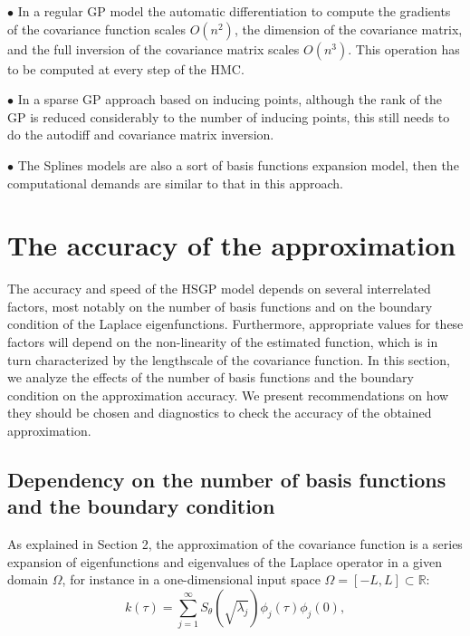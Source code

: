 \documentclass[]{interact}
\theoremstyle{plain}%
\theoremstyle{definition}
\theoremstyle{remark}
\begin{document}
\vspace{2mm}
$\bullet$ In a regular GP model the automatic differentiation to compute the gradients of the covariance function scales $O(n^2)$, the dimension of the covariance matrix, and the full inversion of the covariance matrix scales $O(n^3)$. This operation has to be computed at every step of the HMC.

\vspace{2mm}
$\bullet$ In a sparse GP approach based on inducing points, although the rank of the GP is reduced considerably to the number of inducing points, this still needs to do the autodiff and covariance matrix inversion.

\vspace{2mm}
$\bullet$ The Splines models are also a sort of basis functions expansion model, then the computational demands are similar to that in this approach.


\section{The accuracy of the approximation}

The accuracy and speed of the HSGP model depends on several interrelated factors, most notably on the number of basis functions and on the boundary condition of the Laplace eigenfunctions. Furthermore, appropriate values for these factors will depend on the non-linearity of the estimated function, which is in turn characterized by the lengthscale of the covariance function.
In this section, we analyze the effects of the number of basis functions and the boundary condition on the approximation accuracy. We present recommendations on how they should be chosen and diagnostics to check the accuracy of the obtained approximation.

\subsection{Dependency on the number of basis functions and the boundary condition}

As explained in Section 2, the approximation of the covariance function is a series expansion of eigenfunctions and eigenvalues of the Laplace operator in a given domain $\Omega$, for instance in a one-dimensional input space $\Omega=[-L,L]\subset \mathbb{R}$:
%
\begin{equation}\label{diffcov}
k(\tau) = \sum_{j=1}^{\infty} S_{\theta} \left(\sqrt{\lambda_j} \right) \phi_j(\tau) \phi_j(0),  \nonumber
\end{equation} 
\end{document}
